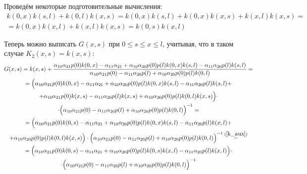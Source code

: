 \documentclass[a4paper,12pt]{article} %
\begin{document}
Проведём некоторые подготовительные вычисления:
\begin{multline}\label{k_aux}
	k(0, x) k(s, l) + k(0, l) k(x, s)
	=
	k(0, x)k(s, l) + k(0, x) k(x, s) + k(x, l) k(x, s)
	=
	\\=
	k(0, x) k(x, l) + k(x, l) k(x, s)
	=
	k(0, s) k(x, l)
\end{multline}

Теперь можно выписать $G(x,s)$ при $0 \leq s\leq x \leq l$,
учитывая, что в таком случае $K_2(x,s) = k(x,s)$:
\begin{multline}
	G(x,s)
	=
	k(x,s)
	+
	\frac{
		  \alpha_{10} \alpha_{21} p(0) k(0, x)
		- \alpha_{11} \alpha_{21}
		+ \alpha_{10} \alpha_{20} p(0) p(l) k(0, x) k(s, l)
		- \alpha_{11} \alpha_{20} p(l) k(s,l)
	}{
		\alpha_{10}\alpha_{21}p(0)  - \alpha_{11}\alpha_{20}p(l) + \alpha_{10}\alpha_{20} p(0) p(l) k(0,l)
	}
	=
	\\=
	\Bigl(
		  \alpha_{10} \alpha_{21} p(0) k(0, x)
		- \alpha_{11} \alpha_{21}
		+ \alpha_{10} \alpha_{20} p(0) p(l) k(0, x) k(s, l)
		- \alpha_{11} \alpha_{20} p(l) k(s, l)
		+ \\
		+ \alpha_{10} \alpha_{21} p(0) k(x, s)
		- \alpha_{11} \alpha_{20} p(l) k(x, s)
		+ \alpha_{10} \alpha_{20} p(0) p(l) k(0,l) k(x,s)
	\Bigr)\cdot \\ \cdot \Bigl(
		\alpha_{10}\alpha_{21}p(0)  - \alpha_{11}\alpha_{20}p(l) + \alpha_{10}\alpha_{20} p(0) p(l) k(0,l)
	\Bigr)^{-1}
	=
	\\=
	\Bigl(
		  \alpha_{10} \alpha_{21} p(0) k(0, s)
		- \alpha_{11} \alpha_{21}
		+ \alpha_{10} \alpha_{20} p(0) p(l) k(0, x) k(s, l)
		- \alpha_{11} \alpha_{20} p(l) k(x, l)
		+ \\
		+ \alpha_{10} \alpha_{20} p(0) p(l) k(0, l) k(x, s)
	\Bigr)\cdot \Bigl(
		\alpha_{10}\alpha_{21}p(0)  - \alpha_{11}\alpha_{20}p(l) + \alpha_{10}\alpha_{20} p(0) p(l) k(0,l)
	\Bigr)^{-1}
	\mathop{=}^{(\ref{k_aux})}
	\\=
	\Bigl(
		  \alpha_{10} \alpha_{21} p(0) k(0, s)
		- \alpha_{11} \alpha_{21}
		+ \alpha_{10} \alpha_{20} p(0) p(l) k(0, s) k(x, l)
		- \alpha_{11} \alpha_{20} p(l) k(x, l)
	\Bigr)\cdot \\ \cdot \Bigl(
		\alpha_{10}\alpha_{21}p(0)  - \alpha_{11}\alpha_{20}p(l) + \alpha_{10}\alpha_{20} p(0) p(l) k(0,l)
	\Bigr)^{-1}
\end{multline}
\end{document}
